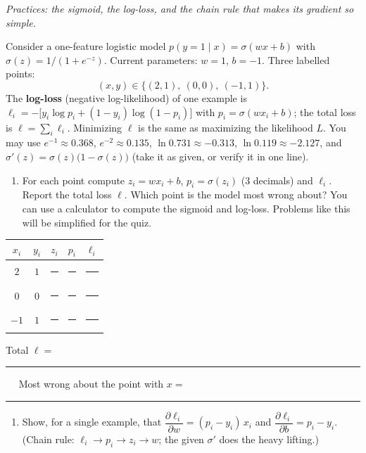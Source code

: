 \documentclass[
  11pt,
]{article}
\newcounter{none} %
\providecommand{\tightlist}{%
  \setlength{\itemsep}{0pt}\setlength{\parskip}{0pt}}
\newcommand{\answerspace}[1]{\par\vspace*{#1}}  %
\newcommand{\blank}[1][1.2in]{\rule{#1}{0.4pt}}
\newcommand{\answerpage}{\clearpage}
\begin{document}
\emph{Practices: the sigmoid, the log-loss, and the chain rule that
makes its gradient so simple.}

Consider a one-feature logistic model
\(p(y{=}1 \mid x) = \sigma(wx + b)\) with \(\sigma(z) = 1/(1+e^{-z})\).
Current parameters: \(w = 1\), \(b = -1\). Three labelled points:
\[(x, y) \in \{(2, 1),\ (0, 0),\ (-1, 1)\}.\] The \textbf{log-loss}
(negative log-likelihood) of one example is
\(\ell_i = -\big[y_i\log p_i + (1-y_i)\log(1-p_i)\big]\) with
\(p_i = \sigma(wx_i + b)\); the total loss is \(\ell = \sum_i \ell_i\).
Minimizing \(\ell\) is the same as maximizing the likelihood \(L\). You
may use \(e^{-1}\approx0.368\), \(e^{-2}\approx0.135\),
\(\ln 0.731\approx-0.313\), \(\ln 0.119\approx-2.127\), and
\(\sigma'(z) = \sigma(z)\big(1-\sigma(z)\big)\) (take it as given, or
verify it in one line).

\begin{enumerate}
\def\labelenumi{(\alph{enumi})}
\tightlist
\item
  For each point compute \(z_i = wx_i + b\), \(p_i = \sigma(z_i)\) (3
  decimals) and \(\ell_i\). Report the total loss \(\ell\). Which point
  is the model most wrong about? You can use a calculator to compute the
  sigmoid and log-loss. Problems like this will be simplified for the
  quiz.
\end{enumerate}

{\def\LTcaptype{none} %
\begin{longtable}[]{@{}ccccc@{}}
\toprule\noalign{}
\(x_i\) & \(y_i\) & \(z_i\) & \(p_i\) & \(\ell_i\) \\
\midrule\noalign{}
\endhead
\bottomrule\noalign{}
\endlastfoot
\(2\) & \(1\) & \blank[0.8in] & \blank[0.8in] & \blank[0.8in] \\
\(0\) & \(0\) & \blank[0.8in] & \blank[0.8in] & \blank[0.8in] \\
\(-1\) & \(1\) & \blank[0.8in] & \blank[0.8in] & \blank[0.8in] \\
\end{longtable}
}

Total \(\ell =\) \blank[0.8in] \(\quad\) Most wrong about the point with
\(x =\) \blank[0.8in]

\answerspace{2in}
\answerpage

\begin{enumerate}
\def\labelenumi{(\alph{enumi})}
\setcounter{enumi}{1}
\tightlist
\item
  Show, for a single example, that
  \(\dfrac{\partial \ell_i}{\partial w} = (p_i - y_i)\,x_i\) and
  \(\dfrac{\partial \ell_i}{\partial b} = p_i - y_i\). (Chain rule:
  \(\ell_i \to p_i \to z_i \to w\); the given \(\sigma'\) does the heavy
  lifting.)
\end{enumerate}
\end{document}
